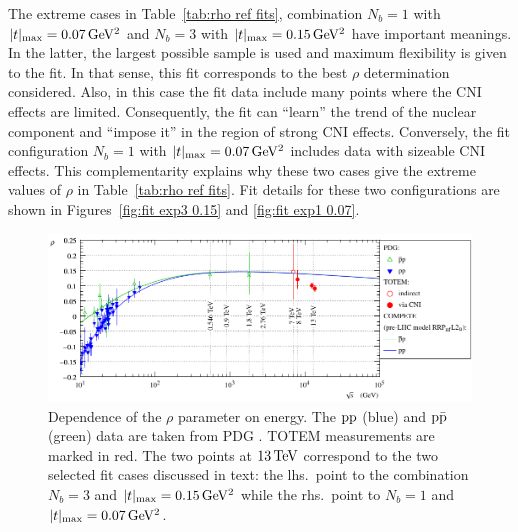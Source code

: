 The extreme cases in Table~\ref{tab:rho ref fits}, combination $N_b=1$ with $|t|_{\rm max} = 0.07\,{\rm GeV^2}$ and $N_b=3$ with $|t|_{\rm max} = 0.15\,{\rm GeV^2}$ have important meanings. In the latter, the largest possible sample is used and maximum flexibility is given to the fit. In that sense, this fit corresponds to the best $\rho$ determination considered. Also, in this case the fit data include many points where the CNI effects are limited. Consequently, the fit can ``learn'' the trend of the nuclear component and ``impose it'' in the region of strong CNI effects. Conversely, the fit configuration $N_b=1$ with $|t|_{\rm max} = 0.07\,{\rm GeV^2}$ includes data with sizeable CNI effects. This complementarity explains why these two cases give the extreme values of $\rho$ in Table~\ref{tab:rho ref fits}. Fit details for these two configurations are shown in Figures~\ref{fig:fit exp3 0.15} and \ref{fig:fit exp1 0.07}.

\begin{figure}
\begin{center}
\includegraphics{fig/rho_vs_s.pdf}
\caption{%
Dependence of the $\rho$ parameter on energy. The $\rm pp$ (blue) and $\rm p\bar p$ (green) data are taken from PDG \cite{pdg-2010}. TOTEM measurements are marked in red. The two points at $13\,{\rm TeV}$ correspond to the two selected fit cases discussed in text: the lhs.~point to the combination $N_b = 3$ and $|t|_{\rm max} = 0.15\,{\rm GeV^2}$ while the rhs.~point to $N_b = 1$ and $|t|_{\rm max} = 0.07\,{\rm GeV^2}$.
}
\label{fig:rho_vs_s}
\end{center}
\end{figure}

